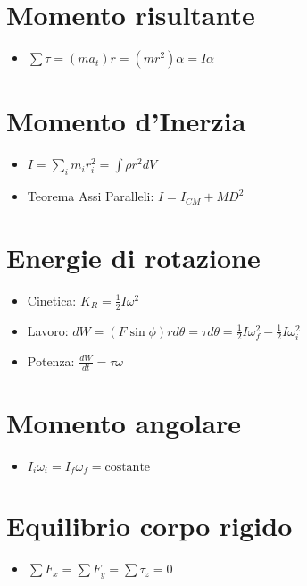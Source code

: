 \documentclass[a4paper,14pt,landscape]{extarticle}
\begin{document}
\begin{multicols*}{2}
    \section*{Momento risultante}
    \begin{itemize}
        \item $\sum \tau = (ma_t)r = (mr^2)\alpha = I\alpha$
    \end{itemize}

    \section*{Momento d'Inerzia}
    \begin{itemize}
        \item $I = \sum_i m_ir_i^2 = \int \rho r^2 dV$
        \item Teorema Assi Paralleli: $I = I_{CM} + MD^2$
    \end{itemize}

    \section*{Energie di rotazione}
    \begin{itemize}
        \item Cinetica: $K_R = \tfrac{1}{2} I\omega^2$
        \item Lavoro: $dW = (F\sin{\phi})rd\theta = \tau d\theta = \tfrac{1}{2} I\omega_f^2 - \tfrac{1}{2}I\omega_i^2$
        \item Potenza: $\tfrac{dW}{dt} = \tau\omega$
    \end{itemize}

    \section*{Momento angolare}
    \begin{itemize}
        \item $I_i\omega_i = I_f\omega_f = \text{costante}$   
    \end{itemize}

    \section*{Equilibrio corpo rigido}
    \begin{itemize}
        \item $\sum F_x = \sum F_y = \sum \tau_z = 0$
    \end{itemize}


\end{multicols*}
\end{document}
